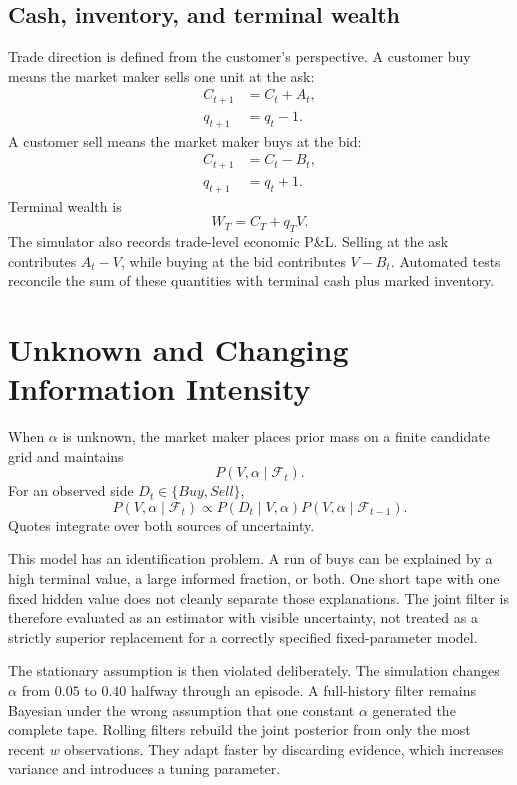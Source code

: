 \documentclass[11pt]{article}
\begin{document}
\subsection{Cash, inventory, and terminal wealth}

Trade direction is defined from the customer's perspective. A customer buy means the market maker sells one unit at the ask:
\begin{align}
C_{t+1}&=C_t+A_t,\\
q_{t+1}&=q_t-1.
\end{align}
A customer sell means the market maker buys at the bid:
\begin{align}
C_{t+1}&=C_t-B_t,\\
q_{t+1}&=q_t+1.
\end{align}
Terminal wealth is
\begin{equation}
W_T=C_T+q_TV.
\end{equation}
The simulator also records trade-level economic P\&L. Selling at the ask contributes $A_t-V$, while buying at the bid contributes $V-B_t$. Automated tests reconcile the sum of these quantities with terminal cash plus marked inventory.

\section{Unknown and Changing Information Intensity}

When $\alpha$ is unknown, the market maker places prior mass on a finite candidate grid and maintains
\begin{equation}
P(V,\alpha\mid\mathcal{F}_t).
\end{equation}
For an observed side $D_t\in\{Buy,Sell\}$,
\begin{equation}
P(V,\alpha\mid\mathcal{F}_t)
\propto
P(D_t\mid V,\alpha)P(V,\alpha\mid\mathcal{F}_{t-1}).
\end{equation}
Quotes integrate over both sources of uncertainty.

This model has an identification problem. A run of buys can be explained by a high terminal value, a large informed fraction, or both. One short tape with one fixed hidden value does not cleanly separate those explanations. The joint filter is therefore evaluated as an estimator with visible uncertainty, not treated as a strictly superior replacement for a correctly specified fixed-parameter model.

The stationary assumption is then violated deliberately. The simulation changes $\alpha$ from $0.05$ to $0.40$ halfway through an episode. A full-history filter remains Bayesian under the wrong assumption that one constant $\alpha$ generated the complete tape. Rolling filters rebuild the joint posterior from only the most recent $w$ observations. They adapt faster by discarding evidence, which increases variance and introduces a tuning parameter.
\end{document}
